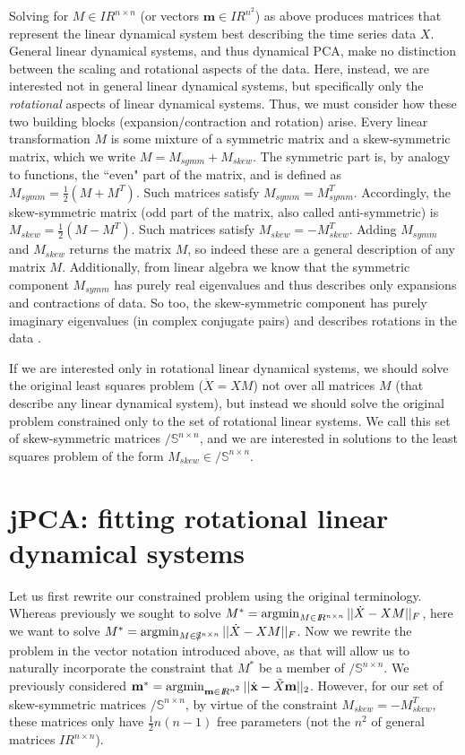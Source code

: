 \documentclass[11pt]{article}%
\def\x{{\mathbf x}}
\def\m{{\mathbf m}}
\newcommand{\reals}{I\!\!R} %
\newcommand{\skewsym}{/\!\!\!\mathbb{S}}
\def\argmin{\qopname\relax n{argmin}}
\begin{document}
Solving for $M\in \reals^{n \times n}$ (or vectors $\m \in \reals^{n^2}$) as above produces matrices that represent the linear dynamical system best describing the time series data $X$.   General linear dynamical systems, and thus dynamical PCA, make no distinction between the scaling and rotational aspects of the data.   Here, instead, we are interested not in general linear dynamical systems, but specifically only the \emph{rotational} aspects of linear dynamical systems.   Thus, we must consider how these two building blocks (expansion/contraction and rotation) arise.  Every linear transformation $M$ is some mixture of a symmetric matrix and a skew-symmetric matrix, which we write $M = M_{symm} + M_{skew}$.  The symmetric part is, by analogy to functions, the ``even" part of the matrix, and is defined as $M_{symm} = \frac{1}{2}(M + M^T)$.  Such matrices satisfy $M_{symm} = M_{symm}^T$.  Accordingly, the skew-symmetric matrix (odd part of the matrix, also called anti-symmetric) is $M_{skew} = \frac{1}{2}(M - M^T)$.  Such matrices satisfy $M_{skew} = -M_{skew}^T$.  Adding $M_{symm}$ and $M_{skew}$ returns the matrix $M$, so indeed these are a general description of any matrix $M$.  Additionally, from linear algebra we know that the symmetric component $M_{symm}$ has purely real eigenvalues and thus describes only expansions and contractions of data.  So too, the skew-symmetric component has purely imaginary eigenvalues (in complex conjugate pairs) and describes rotations in the data \cite{strang, luenberger}.  

If we are interested only in rotational linear dynamical systems, we should solve the original least squares problem ($\dot X = XM$) not over all matrices $M$ (that describe any linear dynamical system), but instead we should solve the original problem constrained only to the set of rotational linear systems.  We call this set of skew-symmetric matrices $\skewsym^{n \times n}$, and we are interested in solutions to the least squares problem of the form $M_{skew} \in \skewsym^{n \times n}$.    


\section*{jPCA: fitting rotational linear dynamical systems}

Let us first rewrite our constrained problem using the original terminology.  Whereas previously we sought to solve $M^* = \argmin_{M \in \reals^{n \times n}} || \dot X - XM ||_F$, here we want to solve $M^* = \argmin_{M \in \skewsym^{n \times n}} || \dot X - XM ||_F$.  Now we rewrite the problem in the vector notation introduced above, as that will allow us to naturally incorporate the constraint that $M^*$ be a member of $\skewsym^{n \times n}$.    We previously considered $\m^* = \argmin_{\m \in \reals^{n^2}} || \dot \x - \tilde{X} \m ||_2$.  However, for our set of skew-symmetric matrices $\skewsym^{n \times n}$, by virtue of the constraint $M_{skew} = -M_{skew}^T$, these matrices only have $\frac{1}{2}n(n-1)$ free parameters (not the $n^2$ of general matrices $\reals^{n \times n}$).
\end{document}
